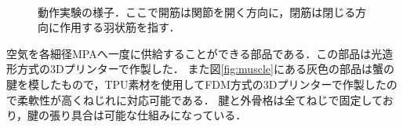 \documentclass{jarticle}
\begin{document}
\vspace*{-4mm}
\begin{figure}[t]
  \centering
  \\
  \vspace{-2mm}
  \vspace{-2mm}
  \caption{動作実験の様子．ここで開筋は関節を開く方向に，閉筋は閉じる方向に作用する羽状筋を指す．}
  \label{fig:jikken}
  \vspace{-2mm}
\end{figure}
\noindent
空気を各細径MPAへ一度に供給することができる部品である．この部品は光造形方式の3Dプリンターで作製した．
また図\ref{fig:muscle}にある灰色の部品は蟹の腱を模したもので，TPU素材を使用してFDM方式の3Dプリンターで作製したので柔軟性が高くねじれに対応可能である．
腱と外骨格は全てねじで固定しており，腱の張り具合は可能な仕組みになっている．
\end{document}

